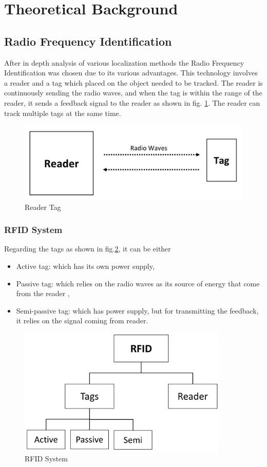 \section{Theoretical Background} \label{Sec_theor}
\subsection{Radio Frequency Identification}
After in depth analysis of various localization methods the Radio Frequency Identification\cite{rfid.application}\cite{rfid.application2} was chosen due to its various advantages.
This technology involves a reader and a tag which placed on the object needed to be tracked. The reader is continuously sending the radio waves, and when the tag is within the range of the reader, it sends a feedback signal to the reader as shown in fig. \ref{reader_tag}. The reader can track multiple tags at the same time.
\begin{figure}[!htbp]
	\centering
	\includegraphics[width = 13cm]{Pictures/readertag}
	\caption{Reader Tag}
	\label{reader_tag}
\end{figure}
\subsubsection{RFID System}
Regarding the tags as shown in fig.\ref{rfid_system}, it can be either
\begin{itemize}
	\item Active tag: which has its own power supply, 
	\item Passive tag: which relies on the radio waves as its source of energy that come from the reader , 
	\item Semi-passive tag: which has power supply, but for transmitting the feedback, it relies on the signal coming from reader.
\end{itemize}
\begin{figure}[!htbp]
	\centering
	\includegraphics[width = 10cm]{Pictures/rfidsystem}
	\caption{RFID System}
	\label{rfid_system}
\end{figure}
